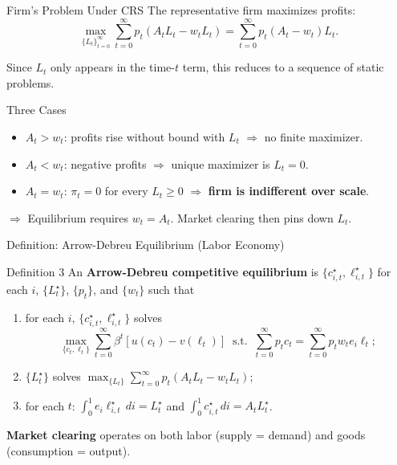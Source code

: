 \documentclass[aspectratio=169,10pt]{beamer}
\newcommand{\apxbutton}[1]{\hfill\hyperlink{#1}{\beamerbutton{Appendix}}}
\begin{document}
\begin{frame}{Firm's Problem Under CRS}
The representative firm maximizes profits:
\[
\max_{\{L_t\}_{t=0}^{\infty}} \sum_{t=0}^{\infty} p_t(A_t L_t - w_t L_t)
= \sum_{t=0}^{\infty} p_t(A_t-w_t)L_t.
\tag{5.6}
\]

Since $L_t$ only appears in the time-$t$ term, this reduces to a sequence of static problems.

\begin{block}{Three Cases}
\begin{itemize}
  \item $A_t > w_t$: profits rise without bound with $L_t$ $\Rightarrow$ no finite maximizer.
  \item $A_t < w_t$: negative profits $\Rightarrow$ unique maximizer is $L_t=0$.
  \item $A_t = w_t$: $\pi_t=0$ for every $L_t\geq 0$ $\Rightarrow$ \textbf{firm is indifferent over scale}.
\end{itemize}
\end{block}

\medskip
$\Rightarrow$ Equilibrium requires $w_t=A_t$. Market clearing then pins down $L_t$.
\apxbutton{a12}
\end{frame}

\begin{frame}{Definition: Arrow-Debreu Equilibrium (Labor Economy)}
\begin{block}{Definition 3}
An \textbf{Arrow-Debreu competitive equilibrium} is $\{c_{i,t}^\star, \ell_{i,t}^\star\}$ for each $i$, $\{L_t^\star\}$, $\{p_t\}$, and $\{w_t\}$ such that
\begin{enumerate}
  \item for each $i$, $\{c_{i,t}^\star, \ell_{i,t}^\star\}$ solves
  \[
  \max_{\{c_t,\ell_t\}} \sum_{t=0}^{\infty}\beta^t[u(c_t)-v(\ell_t)] \;\;\text{s.t.}\;\; \sum_{t=0}^{\infty} p_t c_t = \sum_{t=0}^{\infty} p_t w_t e_i \ell_t;
  \tag{5.7}
  \]
  \item $\{L_t^\star\}$ solves $\displaystyle\max_{\{L_t\}} \sum_{t=0}^{\infty} p_t(A_t L_t - w_t L_t)$;
  \item for each $t$: $\displaystyle\int_0^1 e_i \ell_{i,t}^\star\,di = L_t^\star$ and $\displaystyle\int_0^1 c_{i,t}^\star\,di = A_t L_t^\star$.
\end{enumerate}
\end{block}

\textbf{Market clearing} operates on both labor (supply = demand) and goods (consumption = output).
\end{frame}
\end{document}
